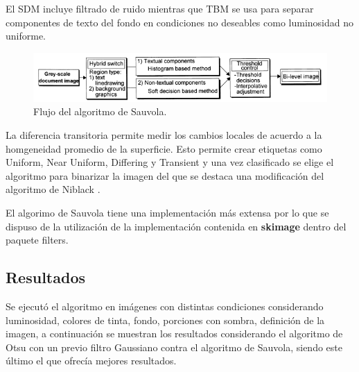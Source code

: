 El SDM incluye filtrado de ruido mientras que TBM se usa para separar componentes de texto del fondo en condiciones no deseables como luminosidad no uniforme.

\begin{figure}[h]
	\centering
	\includegraphics[width=1.0\textwidth]{capitulo5/imageprocessor/sauvola.png}
	\caption{Flujo del algoritmo de Sauvola.}
	\label{fig:sauvola_process}
\end{figure}

La diferencia transitoria permite medir los cambios locales de acuerdo a la homgeneidad promedio de la superficie.
Esto permite crear etiquetas como Uniform, Near Uniform, Differing y Transient y una vez clasificado se elige el algoritmo para binarizar la imagen del que se destaca una modificación del algoritmo de Niblack \cite{inproceedings}.


El algorimo de Sauvola tiene una implementación más extensa por lo que se dispuso de la utilización de la implementación contenida en \textbf{skimage} dentro del paquete filters.





\subsection{Resultados}


Se ejecutó el algoritmo en imágenes con distintas condiciones considerando luminosidad, colores de tinta, fondo, porciones con sombra, definición de la imagen, a continuación se muestran los resultados considerando el algoritmo de Otsu con un previo filtro Gaussiano contra el algoritmo de Sauvola, siendo este último el que ofrecía mejores resultados.

